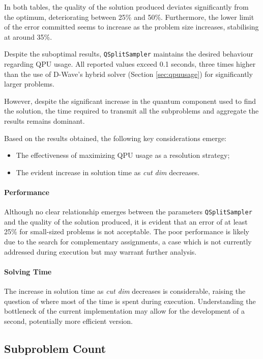 In both tables, the quality of the solution produced deviates significantly from the optimum, deteriorating between 25\% and 50\%. 
Furthermore, the lower limit of the error committed seems to increase as the problem size increases, stabilising at around 35\%.

Despite the suboptimal results, \texttt{QSplitSampler} maintains the desired behaviour regarding QPU usage. 
All reported values exceed 0.1 seconds, three times higher than the use of D-Wave's hybrid solver (Section \ref{sec:qpuusage}) for significantly larger problems.

However, despite the significant increase in the quantum component used to find the solution, the time required to transmit all the subproblems and aggregate the results remains dominant.

Based on the results obtained, the following key considerations emerge: 
\begin{itemize} 
    \item The effectiveness of maximizing QPU usage as a resolution strategy; 
    \item The evident increase in solution time as \emph{cut dim} decreases. 
\end{itemize}

\paragraph{Performance} Although no clear relationship emerges between the parameters \texttt{QSplitSampler} and the quality of the solution produced, it is evident that an error of at least 25\% for small-sized problems is not acceptable. 
The poor performance is likely due to the search for complementary assignments, a case which is not currently addressed during execution but may warrant further analysis.

\paragraph{Solving Time} The increase in solution time as \emph{cut dim} decreases is considerable, raising the question of where most of the time is spent during execution. 
Understanding the bottleneck of the current implementation may allow for the development of a second, potentially more efficient version.

\subsection{Subproblem Count}\label{sec:subproblemcount}

